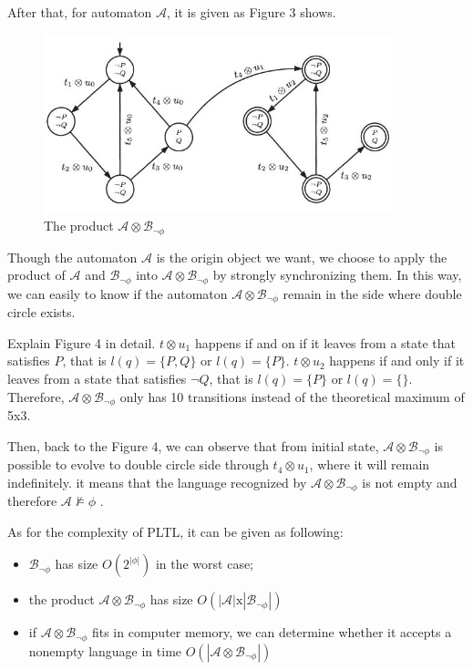 \documentclass[11pt, conference]{IEEEtran}
\begin{document}
    After that, for automaton $\mathcal{A}$, it is given as Figure 3 shows.

\begin{figure}
  \centering
  \includegraphics[width=4.0in]{3_3.jpg}
  \caption{The product $\mathcal{A}\otimes\mathcal{B}_{\neg\phi}$}
\end{figure}

    Though the automaton $\mathcal{A}$ is the origin object we want, we choose to apply the product of $\mathcal{A}$ and $\mathcal{B}_{\neg\phi}$ into $\mathcal{A}\otimes\mathcal{B}_{\neg\phi}$ by strongly synchronizing them. In this way, we can easily to know if the automaton $\mathcal{A}\otimes\mathcal{B}_{\neg\phi}$ remain in the side where double circle exists.
    
    Explain Figure 4 in detail. $t\otimes u_1$ happens if and on if it leaves from a state that satisfies $P$, that is $l(q)=\{P,Q\}$ or $l(q)=\{P\}$. $t\otimes u_2$ happens if and only if it leaves from a state that satisfies $\neg Q$, that is $l(q)=\{P\}$ or $l(q)=\{\}$. Therefore, $\mathcal{A}\otimes\mathcal{B}_{\neg\phi}$ only has 10 transitions instead of the theoretical maximum of 5x3.
    
    Then, back to the Figure 4, we can observe that from initial state, $\mathcal{A}\otimes\mathcal{B}_{\neg\phi}$ is possible to evolve to double circle side through $t_4\otimes u_1$, where it will 
    remain indefinitely. it means that the language recognized by $\mathcal{A}\otimes\mathcal{B}_{\neg\phi}$ is not empty and therefore $\mathcal{A} \nvDash \phi$ .
    
    As for the complexity of PLTL, it can be given as following:
    \begin{itemize}
      \item $\mathcal{B}_{\neg\phi}$ has size $O(2^{|\phi|})$ in the worst case;
      \item the product $\mathcal{A}\otimes\mathcal{B}_{\neg\phi}$ has size $O(|\mathcal{A}|\text{x}|\mathcal{B}_{\neg\phi}|)$
      \item if $\mathcal{A}\otimes\mathcal{B}_{\neg\phi}$ fits in computer memory, we can determine whether it accepts a nonempty language in time $O(|\mathcal{A}\otimes\mathcal{B}_{\neg\phi}|)$
    \end{itemize}
    
\end{document}
